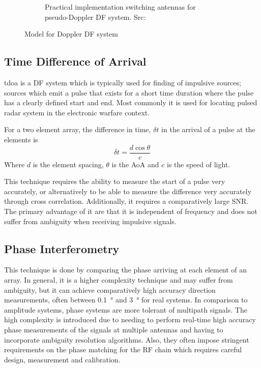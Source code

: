 \begin{figure}
\begin{subfigure}[b]{0.48\textwidth}
    \caption{Practical implementation switching antennas for pseudo-Doppler DF system. Src: \cite{jenkins1991smallaperture}}
  \end{subfigure}
  \caption{Model for Doppler DF system}
  \label{fig:lit-review-doppler-switching}
\end{figure}


\subsection{Time Difference of Arrival}
\gls{tdoa} is a DF system which is typically used for finding of impulsive sources; sources which emit a pulse that exists for a short time duration where the pulse has a clearly defined start and end. Most commonly it is used for locating pulsed radar system in the electronic warfare context.

For a two element array, the difference in time, \(\delta t\) in the arrival of a pulse at the elements is
\begin{equation}
  \delta t = \frac{d \cos \theta}{c}
\end{equation}
Where \(d\) is the element spacing, \(\theta\) is the AoA and \(c\) is the speed of light.

This technique requires the ability to measure the start of a pulse very accurately, or alternatively to be able to measure the difference very accurately through cross correlation. Additionally, it requires a comparatively large SNR. The primary advantage of it are that it is independent of frequency and does not suffer from ambiguity when receiving impulsive signals\cite{jenkins1991smallaperture}.

\subsection{Phase Interferometry}
This technique is done by comparing the phase arriving at each element of an array.
In general, it is a higher complexity technique and may suffer from ambiguity, but it can achieve comparatively high accuracy direction measurements, often between \SI{0.1}{\degree} and \SI{3}{\degree} for real systems\cite{center2012electronic}.
In comparison to amplitude systems, phase systems are more tolerant of multipath signals. 
The high complexity is introduced due to needing to perform real-time high accuracy phase measurements of the signals at multiple antennas and having to incorporate ambiguity resolution algorithms.
Also, they often impose stringent requirements on the phase matching for the RF chain which requires careful design, measurement and calibration\cite{schleher1999electronic}.

